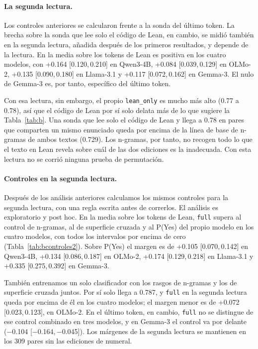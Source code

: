 \documentclass[10pt]{article}
\newcommand{\vr}[1]{\texttt{#1}}
\newcommand{\ic}[2]{[#1,\,#2]}
\begin{document}
\paragraph{La segunda lectura.}
Los controles anteriores se calcularon frente a la sonda del último token. La brecha sobre la sonda que lee solo el código de Lean, en cambio, se midió también en la segunda lectura, añadida después de los primeros resultados, y depende de la lectura. En la media
sobre los tokens de Lean es positiva en los cuatro modelos, con +0.164 \ic{0.120}{0.210} en Qwen3-4B, +0.084
\ic{0.039}{0.129} en OLMo-2, +0.135 \ic{0.090}{0.180} en Llama-3.1 y +0.117 \ic{0.072}{0.162} en Gemma-3. El nulo
de Gemma-3 es, por tanto, específico del último token.

Con esa lectura, sin embargo, el propio \vr{lean\_only} es mucho más alto (0.77 a 0.78), así que el código de Lean por sí solo delata más de lo que sugiere la Tabla~\ref{tab:b}. Una sonda que lee solo el código de Lean y llega a 0.78 en pares que
comparten un mismo enunciado queda por encima de la línea de base de n-gramas de ambos textos (0.729). Los n-gramas,
por tanto, no recogen todo lo que el texto en Lean revela sobre cuál de las dos ediciones es la inadecuada. Con
esta lectura no se corrió ninguna prueba de permutación.

\paragraph{Controles en la segunda lectura.} Después de los análisis anteriores calculamos los mismos controles para
la segunda lectura, con una regla escrita antes de correrlos. El análisis es exploratorio y post hoc. En la media
sobre los tokens de Lean, \vr{full} supera al control de n-gramas, al de superficie cruzada y al P(Yes) del propio
modelo en los cuatro modelos, con todos los intervalos por encima de cero (Tabla~\ref{tab:bcontroles2}). Sobre P(Yes)
el margen es de +0.105 \ic{0.070}{0.142} en Qwen3-4B, +0.134 \ic{0.086}{0.187} en OLMo-2, +0.174 \ic{0.129}{0.218} en
Llama-3.1 y +0.335 \ic{0.275}{0.392} en Gemma-3.

También entrenamos un solo clasificador con los rasgos de n-gramas y los de superficie cruzada juntos. Por sí solo
llega a 0.787, y \vr{full} en la segunda lectura queda por encima de él en los cuatro modelos; el margen menor es de
+0.072 \ic{0.023}{0.123}, en OLMo-2. En el último token, en cambio, \vr{full} no se distingue de ese control combinado
en tres modelos, y en Gemma-3 el control va por delante (−0.104 \ic{−0.164}{−0.045}). Los márgenes de la segunda
lectura se mantienen en los 309 pares sin las ediciones de numeral.
\end{document}
